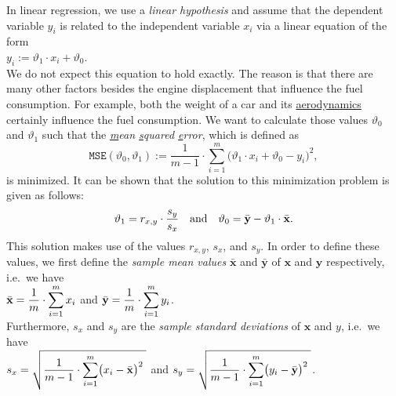 In linear regression, we use a \emph{\color{blue}linear hypothesis} 
and assume that the dependent variable $y_i$ is related to the independent variable $x_i$ via a linear
equation of the form
\\[0.2cm]
\hspace*{1.3cm}
$y_i := \vartheta_1 \cdot x_i + \vartheta_0$.
\\[0.2cm]
We do not expect this equation to hold exactly.  The reason is that there are many other factors besides the
engine displacement that influence the fuel consumption.  For example, both the weight of a car and its 
\href{https://en.wikipedia.org/wiki/Automotive_aerodynamics}{aerodynamics} certainly influence the fuel consumption.  
We want to calculate those values $\vartheta_0$ and $\vartheta_1$ such that the 
\emph{\color{blue}\underline{m}ean \underline{s}quared \underline{e}rror}, which is defined as 
\begin{equation}
  \label{eq:mse}
 \mathtt{MSE}(\vartheta_0, \vartheta_1) := \frac{1}{m-1} \cdot \sum\limits_{i=1}^m \bigl(\vartheta_1 \cdot x_i + \vartheta_0 - y_i\bigr)^2,
\end{equation}
is minimized.  It can be shown that the solution to this minimization problem is given as follows:
\begin{equation}
  \label{eq:theta0}
   \vartheta_1 = r_{x,y} \cdot \frac{s_y}{s_x} \quad \mbox{and} \quad \displaystyle\vartheta_0 = \bar{\mathbf{y}} - \vartheta_1 \cdot \bar{\mathbf{x}}.
\end{equation}
This solution makes use of the values $r_{x,y}$, $s_x$, and $s_y$.  In order to define these values, we first
define the \emph{\color{blue}sample mean values} $\bar{\mathbf{x}}$ and $\bar{\mathbf{y}}$ of $\mathbf{x}$ and $\mathbf{y}$ respectively, i.e.~we have 
\\[0.2cm]
\hspace*{1.3cm}
$\displaystyle \bar{\mathbf{x}} = \frac{1}{m} \cdot \sum\limits_{i=1}^m x_i$ \quad and \quad
$\displaystyle \bar{\mathbf{y}} = \frac{1}{m} \cdot \sum\limits_{i=1}^m y_i$.
\\[0.2cm]
Furthermore, $s_x$ and $s_y$ are the \emph{\color{blue}sample standard deviations} of $\mathbf{x}$ and $y$, i.e.~we have
\\[0.2cm]
\hspace*{1.3cm}
$\displaystyle s_x = \sqrt{\frac{1}{m-1} \cdot \sum\limits_{i=1}^m \bigl(x_i - \bar{\mathbf{x}}\bigr)^2\;}$ \quad and \quad
$\displaystyle s_y = \sqrt{\frac{1}{m-1} \cdot \sum\limits_{i=1}^m \bigl(y_i - \bar{\mathbf{y}}\bigr)^2\;}$.
\\[0.2cm]
